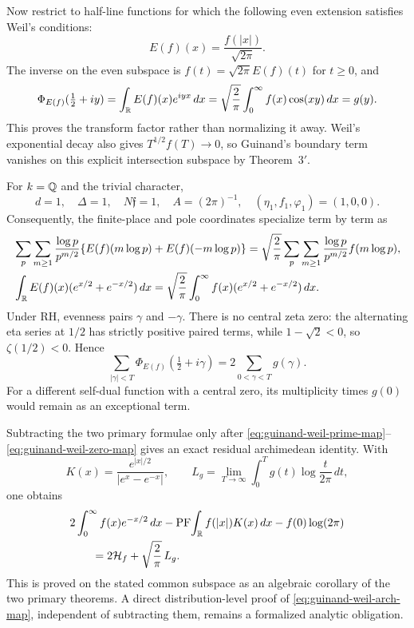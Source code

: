 Now restrict to half-line functions for which the following even extension satisfies Weil's
conditions:
\begin{equation}
 E(f)(x)=\frac{f(|x|)}{\sqrt{2\pi}}.
 \label{eq:guinand-weil-even-map}
\end{equation}
The inverse on the even subspace is $f(t)=\sqrt{2\pi}E(f)(t)$ for $t\geq0$, and
\begin{equation}
 \Phi_{E(f)}(\tfrac12+iy)
 =\int_\mathbb R E(f)(x)e^{iyx}\,dx
 =\sqrt{\frac2\pi}\int_0^\infty f(x)\cos(xy)\,dx
 =g(y).
 \label{eq:guinand-weil-transform}
\end{equation}
This proves the transform factor rather than normalizing it away.  Weil's exponential decay
also gives $T^{1/2}f(T)\to0$, so Guinand's boundary term
\cite[pp.~112--115, Thm.~3$'$]{guinand1948} vanishes on this explicit
intersection subspace by Theorem~$3'$.

For $k=\mathbb{Q}$ and the trivial character,
\[
 d=1,\quad\Delta=1,\quad N\mathfrak f=1,\quad A=(2\pi)^{-1},
 \quad(\eta_1,f_1,\varphi_1)=(1,0,0).
\]
Consequently, the finite-place and pole coordinates specialize term by term as
\begin{align}
 &\sum_p\sum_{m\geq1}\frac{\log p}{p^{m/2}}
 \{E(f)(m\log p)+E(f)(-m\log p)\}
 =\sqrt{\frac2\pi}\sum_p\sum_{m\geq1}
 \frac{\log p}{p^{m/2}}f(m\log p),
 \label{eq:guinand-weil-prime-map}\\
 &\int_\mathbb R E(f)(x)(e^{x/2}+e^{-x/2})\,dx
 =\sqrt{\frac2\pi}\int_0^\infty
 f(x)(e^{x/2}+e^{-x/2})\,dx.
 \label{eq:guinand-weil-pole-map}
\end{align}
Under RH, evenness pairs $\gamma$ and $-\gamma$.  There is no central zeta zero: the
alternating eta series at $1/2$ has strictly positive paired terms, while
$1-\sqrt2<0$, so $\zeta(1/2)<0$.  Hence
\begin{equation}
 \sum_{|\gamma|<T}\Phi_{E(f)}(\tfrac12+i\gamma)
 =2\sum_{0<\gamma<T}g(\gamma).
 \label{eq:guinand-weil-zero-map}
\end{equation}
For a different self-dual function with a central zero, its multiplicity times $g(0)$ would
remain as an exceptional term.

Subtracting the two primary formulae only after
\eqref{eq:guinand-weil-prime-map}--\eqref{eq:guinand-weil-zero-map} gives an exact residual
archimedean identity.  With
\[
 K(x)=\frac{e^{|x|/2}}{|e^x-e^{-x}|},\qquad
 L_g=\lim_{T\to\infty}\int_0^Tg(t)\log\frac{t}{2\pi}\,dt,
\]
one obtains
\begin{align}
 &2\int_0^\infty f(x)e^{-x/2}\,dx
 -\operatorname{PF}\!\int_\mathbb R f(|x|)K(x)\,dx-f(0)\log(2\pi)\notag\\
 &\qquad=2\mathcal H_f+\sqrt{\frac2\pi}\,L_g.
 \label{eq:guinand-weil-arch-map}
\end{align}
This is proved on the stated common subspace as an algebraic corollary of the two primary
theorems.  A direct distribution-level proof of
\eqref{eq:guinand-weil-arch-map}, independent of subtracting them, remains a formalized
analytic obligation.

